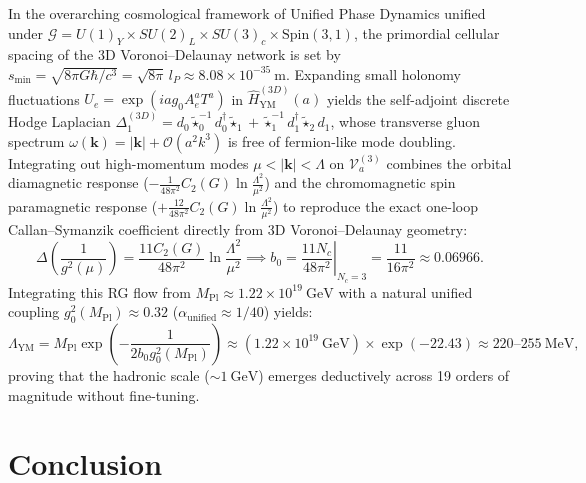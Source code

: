 \documentclass[11pt, a4paper]{article}
\theoremstyle{definition}
\theoremstyle{remark}
\begin{document}
In the overarching cosmological framework of Unified Phase Dynamics unified under $\mathcal{G} = U(1)_{Y} \times SU(2)_{L} \times SU(3)_{c} \times \mathrm{Spin}(3,1)$, the primordial cellular spacing of the 3D Voronoi--Delaunay network is set by $s_{\min} = \sqrt{8\pi G\hbar/c^{3}} = \sqrt{8\pi}\,l_{P} \approx 8.08 \times 10^{-35}~\mathrm{m}$. Expanding small holonomy fluctuations $U_{e} = \exp(iag_{0}A_{e}^{a}T^{a})$ in $\hat{H}_{\mathrm{YM}}^{(3D)}(a)$ yields the self-adjoint discrete Hodge Laplacian $\Delta_{1}^{(3D)} = d_{0}\tilde{\star}_{0}^{-1}d_{0}^{\dagger}\tilde{\star}_{1} + \tilde{\star}_{1}^{-1}d_{1}^{\dagger}\tilde{\star}_{2}d_{1}$, whose transverse gluon spectrum $\omega(\mathbf{k}) = |\mathbf{k}| + \mathcal{O}(a^{2}k^{3})$ is free of fermion-like mode doubling. Integrating out high-momentum modes $\mu < |\mathbf{k}| < \Lambda$ on $\mathcal{V}_{a}^{(3)}$ combines the orbital diamagnetic response ($-\frac{1}{48\pi^{2}}C_{2}(G)\ln\frac{\Lambda^{2}}{\mu^{2}}$) and the chromomagnetic spin paramagnetic response ($+\frac{12}{48\pi^{2}}C_{2}(G)\ln\frac{\Lambda^{2}}{\mu^{2}}$) to reproduce the exact one-loop Callan--Symanzik coefficient directly from 3D Voronoi--Delaunay geometry:
\begin{equation}
  \Delta\!\left(\frac{1}{g^{2}(\mu)}\right) = \frac{11C_{2}(G)}{48\pi^{2}}\ln\frac{\Lambda^{2}}{\mu^{2}} \implies b_{0} = \left.\frac{11N_{c}}{48\pi^{2}}\right|_{N_{c}=3} = \frac{11}{16\pi^{2}} \approx 0.06966.
\end{equation}
Integrating this RG flow from $M_{\mathrm{Pl}} \approx 1.22 \times 10^{19}~\mathrm{GeV}$ with a natural unified coupling $g_{0}^{2}(M_{\mathrm{Pl}}) \approx 0.32$ ($\alpha_{\mathrm{unified}} \approx 1/40$) yields:
\begin{equation}
  \Lambda_{\mathrm{YM}} = M_{\mathrm{Pl}}\exp\!\left(-\frac{1}{2b_{0}g_{0}^{2}(M_{\mathrm{Pl}})}\right) \approx (1.22 \times 10^{19}~\mathrm{GeV}) \times \exp(-22.43) \approx 220\text{--}255~\mathrm{MeV},
\end{equation}
proving that the hadronic scale ($\sim 1~\mathrm{GeV}$) emerges deductively across 19 orders of magnitude without fine-tuning.

\section{Conclusion}
\end{document}
